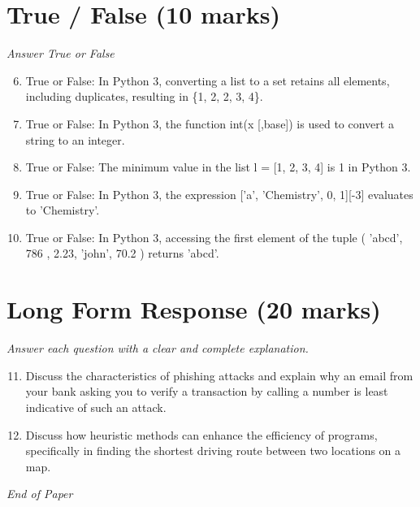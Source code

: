 \documentclass[12pt]{article}
\begin{document}
\section*{True / False (10 marks)}
\textit{Answer True or False}
\begin{enumerate}[label=\arabic*.]
\setcounter{enumi}{5}
\item True or False: In Python 3, converting a list to a set retains all elements, including duplicates, resulting in \{1, 2, 2, 3, 4\}.
\item True or False: In Python 3, the function int(x [,base]) is used to convert a string to an integer.
\item True or False: The minimum value in the list l = [1, 2, 3, 4] is 1 in Python 3.
\item True or False: In Python 3, the expression ['a', 'Chemistry', 0, 1][-3] evaluates to 'Chemistry'.
\item True or False: In Python 3, accessing the first element of the tuple ( 'abcd', 786 , 2.23, 'john', 70.2 ) returns 'abcd'.
\end{enumerate}

\section*{Long Form Response (20 marks)}
\textit{Answer each question with a clear and complete explanation.}
\begin{enumerate}[label=\arabic*.]
\setcounter{enumi}{10}
\item Discuss the characteristics of phishing attacks and explain why an email from your bank asking you to verify a transaction by calling a number is least indicative of such an attack.
\item Discuss how heuristic methods can enhance the efficiency of programs, specifically in finding the shortest driving route between two locations on a map.
\end{enumerate}

\vfill
\noindent\textit{End of Paper}
\end{document}
